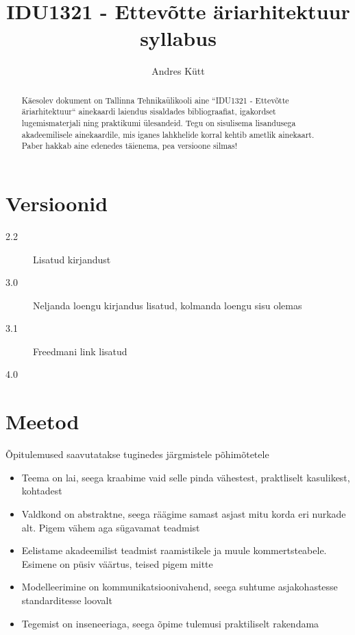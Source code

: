 \documentclass[nobib]{tufte-handout}
\title{IDU1321 - Ettevõtte äriarhitektuur syllabus}
\author[Andres Kütt]{Andres Kütt}
\begin{document}
\maketitle
\begin{abstract}
\noindent
Käesolev dokument on Tallinna Tehnikaülikooli aine ``IDU1321 - Ettevõtte äriarhitektuur`` ainekaardi laiendus sisaldades bibliograafiat, igakordset lugemismaterjali ning praktikumi ülesandeid. Tegu on sisulisema lisandusega akadeemilisele ainekaardile, mis iganes lahkhelide korral kehtib ametlik ainekaart. Paber hakkab aine edenedes täienema, pea versioone silmas!
\end{abstract}

\section{Versioonid}
\begin{description}
	\item[2.2] Lisatud kirjandust
	\item[3.0] Neljanda loengu kirjandus lisatud, kolmanda loengu sisu olemas
	\item[3.1] Freedmani link lisatud
	\item[4.0] 
\end{description}

\section{Meetod}
Õpitulemused saavutatakse tuginedes järgmistele põhimõtetele
\begin{itemize}
	\item Teema on lai, seega kraabime vaid selle pinda vähestest, praktliselt kasulikest, kohtadest
	\item Valdkond on abstraktne, seega räägime samast asjast mitu korda eri nurkade alt. Pigem vähem aga sügavamat teadmist
	\item Eelistame akadeemilist teadmist raamistikele ja muule kommertsteabele. Esimene on püsiv väärtus, teised pigem mitte
	\item Modelleerimine on kommunikatsioonivahend, seega suhtume asjakohastesse standarditesse loovalt
	\item Tegemist on inseneeriaga, seega õpime tulemusi praktiliselt rakendama
\end{itemize}
\end{document}
